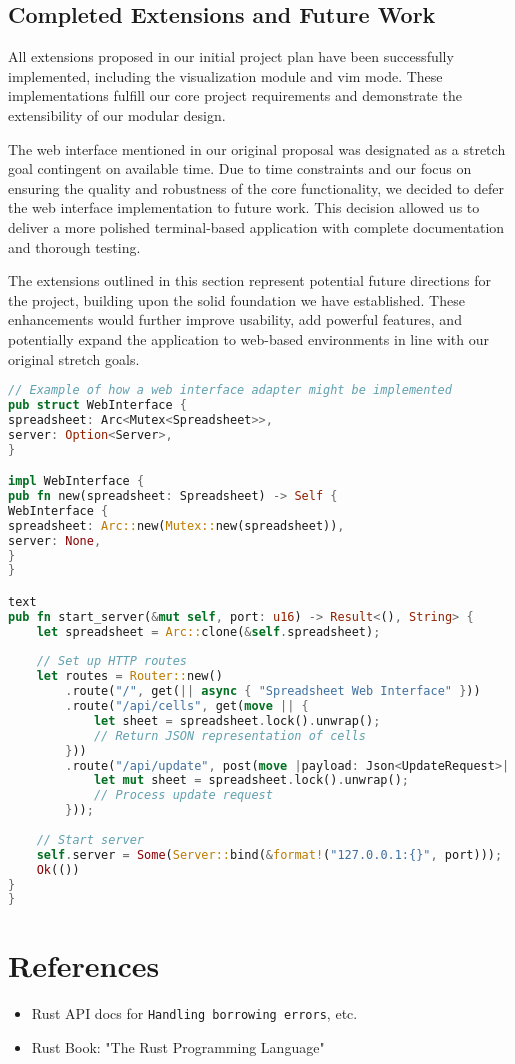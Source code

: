 \documentclass[11pt,a4paper]{article}
\begin{document}
\subsection{Completed Extensions and Future Work}

All extensions proposed in our initial project plan have been successfully implemented, including the visualization module and vim mode. These implementations fulfill our core project requirements and demonstrate the extensibility of our modular design.

The web interface mentioned in our original proposal was designated as a stretch goal contingent on available time. Due to time constraints and our focus on ensuring the quality and robustness of the core functionality, we decided to defer the web interface implementation to future work. This decision allowed us to deliver a more polished terminal-based application with complete documentation and thorough testing.

The extensions outlined in this section represent potential future directions for the project, building upon the solid foundation we have established. These enhancements would further improve usability, add powerful features, and potentially expand the application to web-based environments in line with our original stretch goals.

\begin{lstlisting}[language=Rust, caption={Potential future web interface implementation}, label=lst:web-interface]
// Example of how a web interface adapter might be implemented
pub struct WebInterface {
spreadsheet: Arc<Mutex<Spreadsheet>>,
server: Option<Server>,
}

impl WebInterface {
pub fn new(spreadsheet: Spreadsheet) -> Self {
WebInterface {
spreadsheet: Arc::new(Mutex::new(spreadsheet)),
server: None,
}
}

text
pub fn start_server(&mut self, port: u16) -> Result<(), String> {
    let spreadsheet = Arc::clone(&self.spreadsheet);
    
    // Set up HTTP routes
    let routes = Router::new()
        .route("/", get(|| async { "Spreadsheet Web Interface" }))
        .route("/api/cells", get(move || {
            let sheet = spreadsheet.lock().unwrap();
            // Return JSON representation of cells
        }))
        .route("/api/update", post(move |payload: Json<UpdateRequest>| {
            let mut sheet = spreadsheet.lock().unwrap();
            // Process update request
        }));
        
    // Start server
    self.server = Some(Server::bind(&format!("127.0.0.1:{}", port)));
    Ok(())
}
}
\end{lstlisting}

\section*{References}
\begin{itemize}
  \item Rust API docs for \texttt{Handling borrowing errors}, etc.
  
  \item Rust Book: "The Rust Programming Language" 
\end{itemize}
\end{document}
